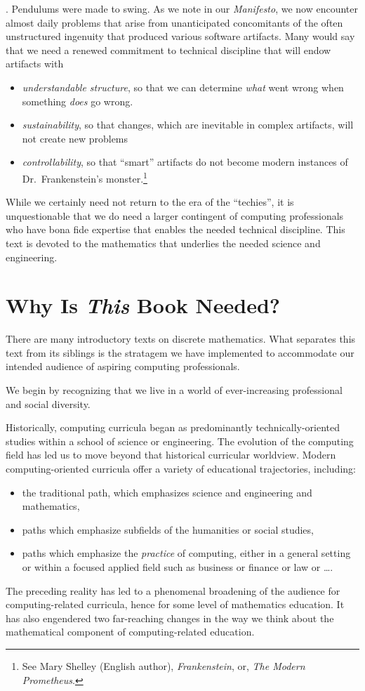 .
Pendulums were made to swing.  As we note in our {\it Manifesto}, we
now encounter almost daily problems that arise from unanticipated
concomitants of the often unstructured ingenuity that produced various
software artifacts.  Many would say that we need a renewed commitment
to technical discipline that will endow artifacts with
\begin{itemize}
\item
{\em understandable structure}, so that we can determine {\em what} went
wrong when something {\em does} go wrong.
\item
{\em sustainability}, so that changes, which are inevitable in complex
artifacts, will not create new problems
\item
{\em controllability}, so that ``smart'' artifacts do not become
modern instances of Dr.~Frankenstein's monster.\footnote{See Mary
  Shelley (English author), {\it Frankenstein}, or, {\it The Modern
    Prometheus}.}
\end{itemize}
While we certainly need not return to the era of the ``techies'', it
is unquestionable that we do need a larger contingent of computing
professionals who have bona fide expertise that enables the needed
technical discipline.  This text is devoted to the mathematics that
underlies the needed science and engineering.


\section{Why Is {\em This} Book Needed?}
\label{sec:thisbookneed}

There are many introductory texts on discrete mathematics.  What
separates this text from its siblings is the stratagem we have
implemented to accommodate our intended audience of aspiring computing
professionals.

We begin by recognizing that we live in a world of ever-increasing
professional and social diversity.

\medskip

Historically, computing curricula began as predominantly
technically-oriented studies within a school of science or
engineering.  The evolution of the computing field has led us to move
beyond that historical curricular worldview.  Modern
computing-oriented curricula offer a variety of educational
trajectories, including:
\begin{itemize}
\item
the traditional path, which emphasizes science and engineering and
mathematics,
\item
paths which emphasize subfields of the humanities or social studies,
\item
paths which emphasize the {\em practice} of computing, either in a
general setting or within a focused applied field such as business or
finance or law or \ldots.
\end{itemize}
The preceding reality has led to a phenomenal broadening of the
audience for computing-related curricula, hence for some level of
mathematics education.  It has also engendered two far-reaching
changes in the way we think about the mathematical component of
computing-related education.


